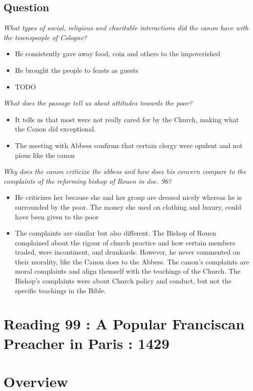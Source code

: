 \documentclass[12pt]{article}
\begin{document}
{\subsection*{Question}
\textit{What types of social, religious and charitable interactions did the canon have with the townspeople of Cologne?}
\begin{itemize}
	\item He consistently gave away food, coin and others to the impoverished
	\item He brought the people to feasts as guests
	\item TODO
\end{itemize}

\textit{What does the passage tell us about attitudes towards the poor?}
\begin{itemize}
	\item It tells us that most were not really cared for by the Church, making what the Canon did exceptional.
	\item The meeting with Abbess confirms that certain clergy were opulent and not pious like the canon
\end{itemize}

\textit{Why does the canon criticize the abbess and how does his concern compare to the complaints of the reforming bishop of Rouen in doc. 96?}
\begin{itemize}
	\item He criticizes her because she and her group are dressed nicely whereas he is surrounded by the poor. The money she used on clothing and luxury, could have been given to the poor
	\item The complaints are similar but also different. The Bishop of Rouen complained about the rigour of church practice and how certain members traded, were incontinent, and drunkards. However, he never commented on their morality, like the Canon does to the Abbess. The canon's complaints are moral complaints and align themself with the teachings of the Church. The Bishop's complaints were about Church policy and conduct, but not the specific teachings in the Bible.
\end{itemize}

\section*{Reading 99 : A Popular Franciscan Preacher in Paris : 1429}

\section*{Overview}

}
\end{document}
